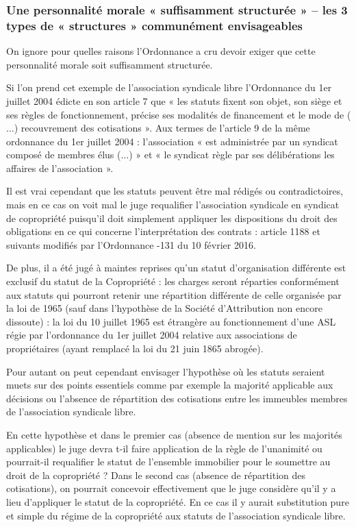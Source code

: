 		\subsubsection{Une personnalité morale « suffisamment structurée » -- les 3 types de	« structures » communément envisageables}
		
		On ignore pour quelles raisons l’Ordonnance a cru devoir exiger que cette personnalité morale soit
		suffisamment structurée.
		
		Si l’on prend cet exemple de l’association syndicale libre l’Ordonnance du 1er juillet 2004 édicte en son
		article 7 que « les statuts fixent son objet, son siège et ses règles de fonctionnement, précise ses modalités
		de financement et le mode de ($\dots$) recouvrement des cotisations ». Aux termes de l’article 9 de la même
		ordonnance du 1er juillet 2004 : l’association « est administrée par un syndicat composé de membres élus
		($\dots$) » et « le syndicat règle par ses délibérations les affaires de l’association ».
		
		Il est vrai cependant que les statuts peuvent être mal rédigés ou contradictoires, mais en ce cas on voit
		mal le juge requalifier l’association syndicale en syndicat de copropriété puisqu’il doit simplement
		appliquer les dispositions du droit des obligations en ce qui concerne l’interprétation des contrats : article
		1188 et suivants modifiés par l’Ordonnance -131 du 10 février 2016.
		
		De plus, il a été jugé à maintes reprises qu'un statut d'organisation différente est exclusif du statut de la
		Copropriété : les charges seront réparties conformément aux statuts qui pourront retenir une répartition
		différente de celle organisée par la loi de 1965 (sauf dans l'hypothèse de la Société d'Attribution non
		encore dissoute) : la loi du 10 juillet 1965 est étrangère au fonctionnement d'une ASL régie par
		l’ordonnance du 1er juillet 2004 relative aux associations de propriétaires (ayant remplacé la loi du 21 juin
		1865 abrogée).
		
		Pour autant on peut cependant envisager l’hypothèse où les statuts seraient muets sur des points
		essentiels comme par exemple la majorité applicable aux décisions ou l’absence de répartition des
		cotisations entre les immeubles membres de l’association syndicale libre.
		
		En cette hypothèse et dans le premier cas (absence de mention sur les majorités applicables) le juge devra t-il faire application de la règle de l’unanimité ou pourrait-il requalifier le statut de l’ensemble immobilier
		pour le soumettre au droit de la copropriété ? Dans le second cas (absence de répartition des cotisations),
		on pourrait concevoir effectivement que le juge considère qu’il y a lieu d’appliquer le statut de la
		copropriété. En ce cas il y aurait substitution pure et simple du régime de la copropriété aux statuts de
		l’association syndicale libre.
		
